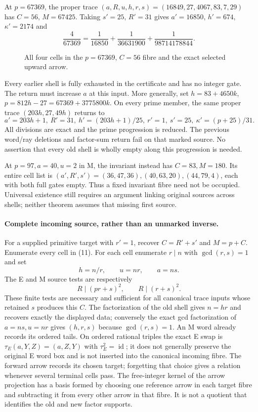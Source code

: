 \documentclass[10pt,reqno]{amsart}
\begin{document}
At $p=67369$, the proper trace $(a,R,u,h,r,s)=(16849,27,4067,83,7,29)$
has $C=56$, $M=67425$. Taking $s'=25$, $R'=31$ gives $a'=16850$, $h'=674$,
$\kappa'=2174$ and
\[
 \frac4{67369}=\frac1{16850}+\frac1{36631900}+\frac1{98714178844}.
\]

\begin{figure}[ht]
\centering

\caption{All four cells in the $p=67369$, $C=56$ fibre and the exact selected
upward arrow.}
\end{figure}

Every earlier shell is fully exhausted in the certificate and has no integer
gate. The return must increase $a$ at this input. More generally, set
$h=83+4650k$, $p=812h-27=67369+3775800k$. On every prime member, the same
proper trace $(203h,27,49h)$ returns to
\[
 a'=203h+1,\ R'=31,\ h'=(203h+1)/25,\ r'=1,\ s'=25,\ \kappa'=(p+25)/31.
\]
All divisions are exact and the prime progression is reduced. The previous
word/ray deletions and factor-sum return fail on that marked source. No assertion
that every old shell is wholly empty along this progression is needed.

At $p=97,a=40,u=2$ in M, the invariant instead has $C=83,M=180$. Its entire
cell list is $(a',R',s')=(36,47,36),(40,63,20),(44,79,4)$, each with both full
gates empty. Thus a fixed invariant fibre need not be occupied. Universal
existence still requires an argument linking original sources across shells;
neither theorem assumes that missing first source.

\paragraph{Complete incoming source, rather than an unmarked inverse.}
For a supplied primitive target with $r'=1$, recover $C=R'+s'$ and
$M=p+C$. Enumerate every cell in (11). For each cell enumerate $r\mid n$
with $\gcd(r,s)=1$ and set
\[
 h=n/r,\qquad u=nr,\qquad a=ns.
\]
The E and M source tests are respectively
\[
 R\mid(pr+s)^2,\qquad R\mid(r+s)^2.
\]
These finite tests are necessary and sufficient for all canonical trace inputs
whose retained $s$ produces this $C$. The factorization of the old shell gives
$n=hr$ and recovers exactly the displayed data; conversely the exact gcd factorization
of $a=ns,u=nr$ gives $(h,r,s)$ because $\gcd(r,s)=1$. An M word already
records its ordered tails. On ordered rational triples the exact E swap is
$\tau_E(a,Y,Z)=(a,Z,Y)$ with $\tau_E^2=\operatorname{id}$; it does not
generally preserve the original E word box and is not inserted into the
canonical incoming fibre.
The forward arrow records its chosen target; forgetting that choice gives a
relation whenever several terminal cells pass. The free-integer kernel of the
arrow projection has a basis formed by choosing one reference arrow in each
target fibre and subtracting it from every other arrow in that fibre. It is not
a quotient that identifies the old and new factor supports.
\end{document}
